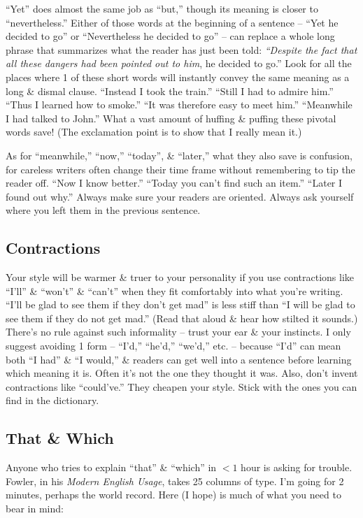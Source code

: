 \documentclass{article}
\begin{document}
``Yet'' does almost the same job as ``but,'' though its meaning is closer to ``nevertheless.'' Either of those words at the beginning of a sentence -- ``Yet he decided to go'' or ``Nevertheless he decided to go'' -- can replace a whole long phrase that summarizes what the reader has just been told: \textit{``Despite the fact that all these dangers had been pointed out to him}, he decided to go.'' Look for all the places where 1 of these short words will instantly convey the same meaning as a long \& dismal clause. ``Instead I took the train.'' ``Still I had to admire him.'' ``Thus I learned how to smoke.'' ``It was therefore easy to meet him.'' ``Meanwhile I had talked to John.'' What a vast amount of huffing \& puffing these pivotal words save! (The exclamation point is to show that I really mean it.)

As for ``meanwhile,'' ``now,'' ``today'', \& ``later,'' what they also save is confusion, for careless writers often change their time frame without remembering to tip the reader off. ``Now I know better.'' ``Today you can't find such an item.'' ``Later I found out why.'' Always make sure your readers are oriented. Always ask yourself where you left them in the previous sentence.

\subsection{Contractions}
Your style will be warmer \& truer to your personality if you use contractions like ``I'll'' \& ``won't'' \& ``can't'' when they fit comfortably into what you're writing. ``I'll be glad to see them if they don't get mad'' is less stiff than ``I will be glad to see them if they do not get mad.'' (Read that aloud \& hear how stilted it sounds.) There's no rule against such informality -- trust your ear \& your instincts. I only suggest avoiding 1 form -- ``I'd,'' ``he'd,'' ``we'd,'' etc. -- because ``I'd'' can mean both ``I had'' \& ``I would,'' \& readers can get well into a sentence before learning which meaning it is. Often it's not the one they thought it was. Also, don't invent contractions like ``could've.'' They cheapen your style. Stick with the ones you can find in the dictionary.

\subsection{That \& Which}
Anyone who tries to explain ``that'' \& ``which'' in $< 1$ hour is asking for trouble. Fowler, in his \textit{Modern English Usage}, takes 25 columns of type. I'm going for 2 minutes, perhaps the world record. Here (I hope) is much of what you need to bear in mind:
\end{document}
